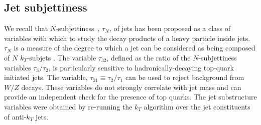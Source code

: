 \subsection{Jet subjettiness}

We recall that $N$-subjettiness~\cite{Thaler:2010tr}, $\tau_{N}$, of jets has been proposed
as a class of variables with which to study the decay products of a heavy particle inside jets.  $\tau_{N}$ is a measure of the degree to which a jet can be considered as being composed of
 $N$  $k_{T}$-subjets \cite{Thaler:2010tr}. 
The variable $\tau_{32}$, defined as the ratio of the $N$-subjettiness variables $\tau_3/\tau_2$, is particularly sensitive to hadronically-decaying
 top-quark initiated jets.
The variable, $\tau_{21} \equiv \tau_2/\tau_1$ can be used to reject background from $W/Z$ decays.
These variables do not strongly correlate with jet mass and can provide an independent check for the
presence of top quarks.
The jet substructure variables were obtained by re-running the $k_T$ algorithm over the jet constituents of anti-$k_T$ jets.

